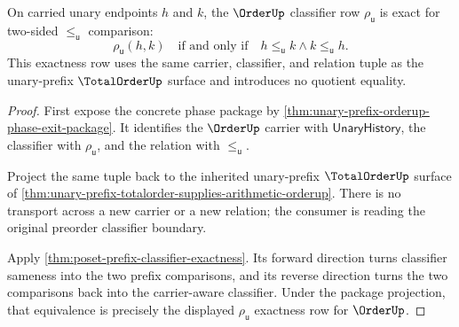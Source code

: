 \begin{theorem}
\label{thm:unary-prefix-orderup-exactness-obligation}
On carried unary endpoints $h$ and $k$, the $\OrderUp$ classifier row
$\rho_{\mathsf{u}}$ is exact for two-sided $\le_{\mathsf{u}}$ comparison:
$$
\rho_{\mathsf{u}}(h,k)
\quad\text{if and only if}\quad
h\le_{\mathsf{u}}k\land k\le_{\mathsf{u}}h.
$$
This exactness row uses the same carrier, classifier, and relation tuple as the
unary-prefix $\TotalOrderUp$ surface and introduces no quotient equality.
\end{theorem}
\begin{proof}
First expose the concrete phase package by
\autoref{thm:unary-prefix-orderup-phase-exit-package}. It identifies the
$\OrderUp$ carrier with $\mathsf{UnaryHistory}$, the classifier with
$\rho_{\mathsf{u}}$, and the relation with $\le_{\mathsf{u}}$.

Project the same tuple back to the inherited unary-prefix $\TotalOrderUp$
surface of \autoref{thm:unary-prefix-totalorder-supplies-arithmetic-orderup}.
There is no transport across a new carrier or a new relation; the consumer is
reading the original preorder classifier boundary.

Apply \autoref{thm:poset-prefix-classifier-exactness}. Its forward direction
turns classifier sameness into the two prefix comparisons, and its reverse
direction turns the two comparisons back into the carrier-aware classifier.
Under the package projection, that equivalence is precisely the displayed
$\rho_{\mathsf{u}}$ exactness row for $\OrderUp$.
\end{proof}

